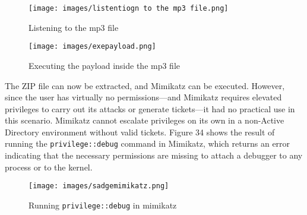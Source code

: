 \documentclass[a4paper]{article}
\newcommand{\abc}{\hfill \break}
\begin{document}
\begin{figure}[h]
	\texttt{[image: images/listentiogn to the mp3 file.png]}
	\centering
	\caption{Listening to the mp3 file}
\end{figure}
\begin{figure}[h]
	\texttt{[image: images/exepayload.png]}
	\centering
	\caption{Executing the payload inside the mp3 file}
\end{figure}\newpage\abc
The ZIP file can now be extracted, and Mimikatz can be executed. However, since the user has virtually no permissions—and Mimikatz requires elevated privileges to carry out its attacks or generate tickets—it had no practical use in this scenario. Mimikatz cannot escalate privileges on its own in a non-Active Directory environment without valid tickets. Figure 34 shows the result of running the \texttt{privilege::debug} command in Mimikatz, which returns an error indicating that the necessary permissions are missing to attach a debugger to any process or to the kernel. \cite{a_cyberkid_detailed_2024}
\begin{figure}[h]
	\texttt{[image: images/sadgemimikatz.png]}
	\centering
	\caption{Running \texttt{privilege::debug} in mimikatz}
\end{figure}\abc \newpage
\end{document}
